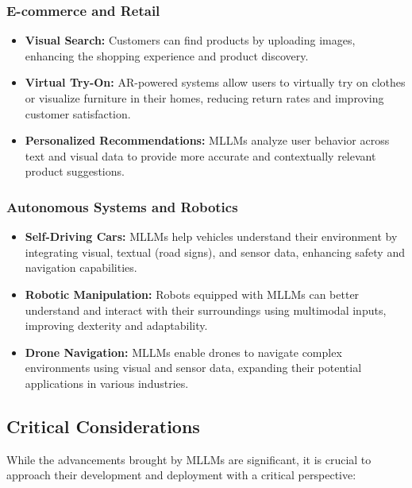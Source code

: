 \subsubsection{E-commerce and Retail}
\begin{itemize}
    \item \textbf{Visual Search:} Customers can find products by uploading images, enhancing the shopping experience and product discovery.
    \item \textbf{Virtual Try-On:} AR-powered systems allow users to virtually try on clothes or visualize furniture in their homes, reducing return rates and improving customer satisfaction.
    \item \textbf{Personalized Recommendations:} MLLMs analyze user behavior across text and visual data to provide more accurate and contextually relevant product suggestions.
\end{itemize}

\subsubsection{Autonomous Systems and Robotics}
\begin{itemize}
    \item \textbf{Self-Driving Cars:} MLLMs help vehicles understand their environment by integrating visual, textual (road signs), and sensor data, enhancing safety and navigation capabilities.
    \item \textbf{Robotic Manipulation:} Robots equipped with MLLMs can better understand and interact with their surroundings using multimodal inputs, improving dexterity and adaptability.
    \item \textbf{Drone Navigation:} MLLMs enable drones to navigate complex environments using visual and sensor data, expanding their potential applications in various industries.
\end{itemize}

\subsection{Critical Considerations}

While the advancements brought by MLLMs are significant, it is crucial to approach their development and deployment with a critical perspective:

